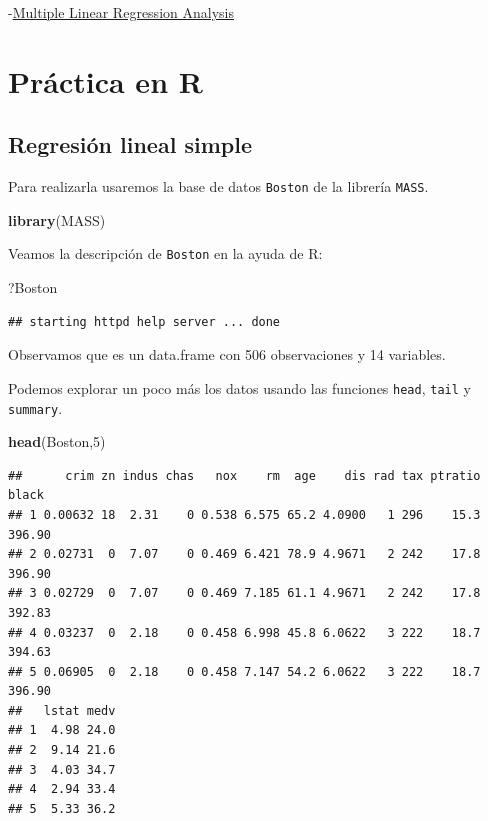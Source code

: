 \documentclass[]{book}
\newenvironment{Shaded}{\begin{snugshade}}{\end{snugshade}}
\newcommand{\DecValTok}[1]{\textcolor[rgb]{0.00,0.00,0.81}{#1}}
\newcommand{\KeywordTok}[1]{\textcolor[rgb]{0.13,0.29,0.53}{\textbf{#1}}}
\newcommand{\NormalTok}[1]{#1}
\begin{document}
-\href{http://reliawiki.org/index.php/Multiple_Linear_Regression_Analysis}{Multiple Linear Regression Analysis}

\hypertarget{practica-en-r-1}{%
\section{Práctica en R}\label{practica-en-r-1}}

\hypertarget{regresion-lineal-simple}{%
\subsection{Regresión lineal simple}\label{regresion-lineal-simple}}

Para realizarla usaremos la base de datos \texttt{Boston} de la librería \texttt{MASS}.

\begin{Shaded}
\begin{Highlighting}[]
\KeywordTok{library}\NormalTok{(MASS)}
\end{Highlighting}
\end{Shaded}

Veamos la descripción de \texttt{Boston} en la ayuda de R:

\begin{Shaded}
\begin{Highlighting}[]
\NormalTok{?Boston}
\end{Highlighting}
\end{Shaded}

\begin{verbatim}
## starting httpd help server ... done
\end{verbatim}

Observamos que es un data.frame con 506 observaciones y 14 variables.

Podemos explorar un poco más los datos usando las funciones \texttt{head}, \texttt{tail} y \texttt{summary}.

\begin{Shaded}
\begin{Highlighting}[]
\KeywordTok{head}\NormalTok{(Boston,}\DecValTok{5}\NormalTok{)}
\end{Highlighting}
\end{Shaded}

\begin{verbatim}
##      crim zn indus chas   nox    rm  age    dis rad tax ptratio  black
## 1 0.00632 18  2.31    0 0.538 6.575 65.2 4.0900   1 296    15.3 396.90
## 2 0.02731  0  7.07    0 0.469 6.421 78.9 4.9671   2 242    17.8 396.90
## 3 0.02729  0  7.07    0 0.469 7.185 61.1 4.9671   2 242    17.8 392.83
## 4 0.03237  0  2.18    0 0.458 6.998 45.8 6.0622   3 222    18.7 394.63
## 5 0.06905  0  2.18    0 0.458 7.147 54.2 6.0622   3 222    18.7 396.90
##   lstat medv
## 1  4.98 24.0
## 2  9.14 21.6
## 3  4.03 34.7
## 4  2.94 33.4
## 5  5.33 36.2
\end{verbatim}
\end{document}

